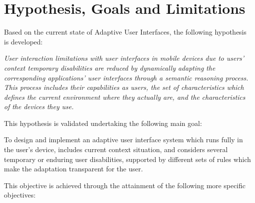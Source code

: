 \section{Hypothesis, Goals and Limitations}
\label{sec:hypothesis}
Based on the current state of Adaptive User Interfaces, the following hypothesis
is developed:
 
\begin{framed}
\textit{User interaction limitations with user interfaces in mobile devices due 
to users' context temporary disabilities are reduced by dynamically adapting the 
corresponding applications' user interfaces through a semantic reasoning process. 
This process includes their capabilities as users, the set of characteristics 
which defines the current environment where they actually are, and the 
characteristics of the devices they use. }
\end{framed}

This hypothesis is validated undertaking the following main goal:

\begin{framed}
 To design and implement an adaptive user interface system which runs fully in
 the user's device, includes current context situation, and considers several
 temporary or enduring user disabilities, supported by different sets of rules
 which make the adaptation transparent for the user.
\end{framed}


This objective is achieved through the attainment of the following more specific
objectives:

